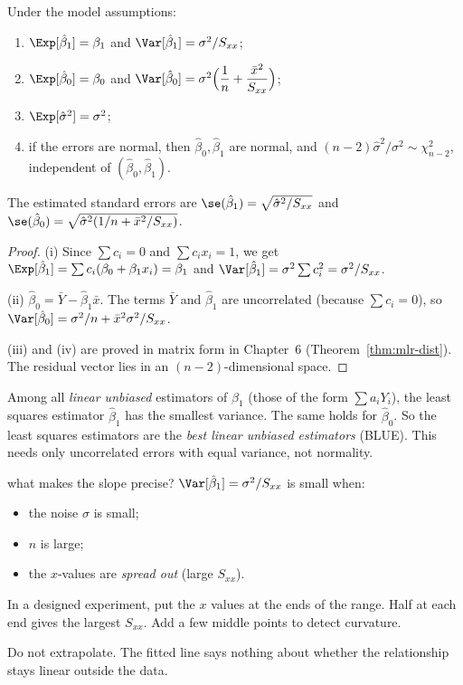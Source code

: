 \begin{theorem}\label{thm:lsprops}
Under the model assumptions:
\begin{enumerate}[label=(\roman*)]
  \item $\Exp[\hat\beta_1]=\beta_1$ and $\Var[\hat\beta_1]=\sigma^2/S_{xx}$;
  \item $\Exp[\hat\beta_0]=\beta_0$ and $\Var[\hat\beta_0]=\sigma^2\Big(\dfrac1n+\dfrac{\bar{x}^2}{S_{xx}}\Big)$;
  \item $\Exp[\hat\sigma^2]=\sigma^2$;
  \item if the errors are normal, then $\hat\beta_0,\hat\beta_1$ are normal, and $(n-2)\hat\sigma^2/\sigma^2\sim\chi^2_{n-2}$, independent of $(\hat\beta_0,\hat\beta_1)$.
\end{enumerate}
The estimated standard errors are $\se(\hat\beta_1)=\sqrt{\hat\sigma^2/S_{xx}}$ and $\se(\hat\beta_0)=\sqrt{\hat\sigma^2(1/n+\bar{x}^2/S_{xx})}$.
\end{theorem}

\begin{proof}
(i) Since $\sum c_i=0$ and $\sum c_ix_i=1$, we get $\Exp[\hat\beta_1]=\sum c_i(\beta_0+\beta_1x_i)=\beta_1$ and $\Var[\hat\beta_1]=\sigma^2\sum c_i^2=\sigma^2/S_{xx}$.

(ii) $\hat\beta_0=\bar{Y}-\hat\beta_1\bar{x}$. The terms $\bar{Y}$ and $\hat\beta_1$ are uncorrelated (because $\sum c_i=0$), so $\Var[\hat\beta_0]=\sigma^2/n+\bar{x}^2\sigma^2/S_{xx}$.

(iii) and (iv) are proved in matrix form in Chapter~6 (Theorem~\ref{thm:mlr-dist}). The residual vector lies in an $(n-2)$-dimensional space.
\end{proof}

\begin{theorem}\label{thm:gm1}
Among all \emph{linear unbiased} estimators of $\beta_1$ (those of the form $\sum a_iY_i$), the least squares estimator $\hat\beta_1$ has the smallest variance. The same holds for $\hat\beta_0$. So the least squares estimators are the \emph{best linear unbiased estimators} (BLUE). This needs only uncorrelated errors with equal variance, not normality.
\end{theorem}

\begin{interview}{what makes the slope precise?}
$\Var[\hat\beta_1]=\sigma^2/S_{xx}$ is small when:
\begin{itemize}
  \item the noise $\sigma$ is small;
  \item $n$ is large;
  \item the $x$-values are \emph{spread out} (large $S_{xx}$).
\end{itemize}
In a designed experiment, put the $x$ values at the ends of the range. Half at each end gives the largest $S_{xx}$. Add a few middle points to detect curvature.

Do not extrapolate. The fitted line says nothing about whether the relationship stays linear outside the data.
\end{interview}

